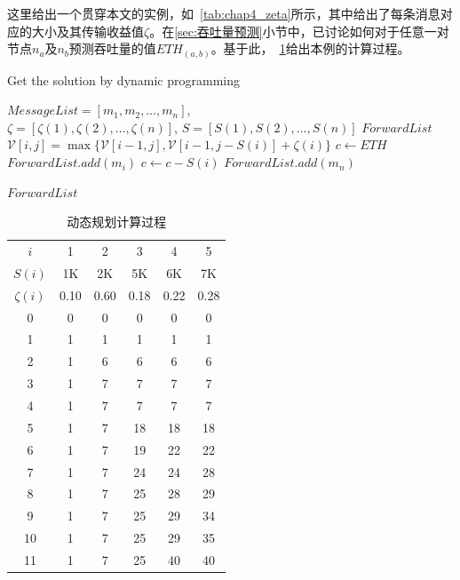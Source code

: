 这里给出一个贯穿本文的实例，如\tablename~\ref{tab:chap4_zeta}所示，其中给出了每条消息对应的大小及其传输收益值$\zeta$。在\ref{sec:吞吐量预测}小节中，已讨论如何对于任意一对节点$n_a$及$n_b$预测吞吐量的值$ETH_{(a,b)}$。基于此，\tablename~\ref{tab:chap4_dynamic_programming}给出本例的计算过程。

\begin{algorithm}[!tbp] %
\renewcommand{\algorithmicrequire}{\textbf{Input:}}
\renewcommand\algorithmicensure {\textbf{Output:} }
\caption{Get the solution by dynamic programming} %
\label{alg:chap4_dynamic_programming} %
\begin{algorithmic}[1] %
\REQUIRE $MessageList=[m_1,m_2,\ldots,m_n]$,\\
$\zeta=[\zeta(1),\zeta(2),\ldots,\zeta(n)]$,
$S=[S(1),S(2),\ldots,S(n)]$
\ENSURE $ForwardList$
        \STATE $\mathcal{V}[i,j]=\max\{\mathcal{V}[i-1,j],\mathcal{V}[i-1,j-S(i)]+\zeta(i)\}$
    \ENDFOR
\ENDFOR
\STATE $c\leftarrow ETH$
        \STATE $ForwardList.add(m_i)$
        \STATE $c\leftarrow c-S(i)$
    \ENDIF
\ENDFOR
{}
    \STATE $ForwardList.add(m_n)$
\ENDIF

\RETURN $ForwardList$
\end{algorithmic}
\end{algorithm}


\begin{table}
\centering
\caption{动态规划计算过程}
\label{tab:chap4_dynamic_programming}
\begin{tabular}{c|ccccc}
\hline
 $i$        & 1 & 2 & 3 & 4 & 5 \\
 $S(i)$     & 1K & 2K & 5K & 6K & 7K \\
 $\zeta(i)$ & 0.10 & 0.60 & 0.18 & 0.22 & 0.28\\
\hline
0 & 0 & 0 & 0 & 0 & 0 \\
1 & 1 & 1 & 1 & 1 & 1\\
2 & 1 & 6 & 6 & 6 & 6\\
3 & 1 & 7 & 7 & 7 & 7\\
4 & 1 & 7 & 7 & 7 & 7\\
5 & 1 & 7 & 18 & 18 & 18 \\
6 & 1 & 7 & 19 & 22 & 22 \\
7 & 1 & 7 & 24 & 24 & 28 \\
8 & 1 & 7 & 25 & 28 & 29 \\
9 & 1 & 7 & 25 & 29 & 34 \\
10 & 1 & 7 & 25 & 29 & 35 \\
11 & 1 & 7 & 25 & 40 & 40 \\
\hline
\end{tabular}

\end{table}

